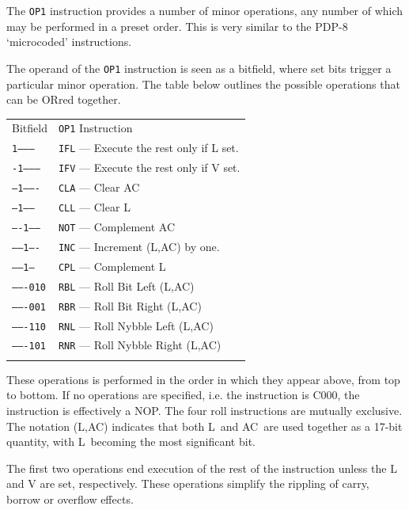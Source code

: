 \documentclass[11pt,a4paper,twocolumns]{article}
\newcommand\zebra{\rowcolors{2}{gray!20}{white}}
\newcommand\hex[1]{\textsf{#1}}
\newcommand\register[1]{\textsf{#1}}
\newcommand\A{\register{AC}}
\newcommand\Lreg{\register{L}}
\newcommand\Vreg{\register{V}}
\begin{document}
The {\tt OP1} instruction provides a number of minor operations, any
number of which may be performed in a preset order. This is very
similar to the PDP-8 ‘microcoded’ instructions.

The operand of the {\tt OP1} instruction is seen as a bitfield, where
set bits trigger a particular minor operation. The table below
outlines the possible operations that can be ORred together.

\vspace{1em}\noindent\begin{center}
\zebra
\begin{tabular}{ll}
  Bitfield & {\tt OP1} Instruction \\\noalign{\smallskip}\hline\noalign{\smallskip}
  {\tt 1---------} & {\tt IFL} — Execute the rest only if \Lreg{} set.\\
  {\tt -1--------} & {\tt IFV} — Execute the rest only if \Vreg{} set.\\
  {\tt --1-------} & {\tt CLA} — Clear \A \\
  {\tt ---1------} & {\tt CLL} — Clear \Lreg \\
  {\tt ----1-----} & {\tt NOT} — Complement \A \\
  {\tt -----1----} & {\tt INC} — Increment (\Lreg,\A) by one. \\
  {\tt ------1---} & {\tt CPL} — Complement \Lreg \\
  {\tt -------010} & {\tt RBL} — Roll Bit Left (\Lreg,\A) \\
  {\tt -------001} & {\tt RBR} — Roll Bit Right (\Lreg,\A) \\
  {\tt -------110} & {\tt RNL} — Roll Nybble Left (\Lreg,\A) \\
  {\tt -------101} & {\tt RNR} — Roll Nybble Right (\Lreg,\A) \\\noalign{\smallskip}\hline\noalign{\smallskip}
\end{tabular}
\end{center}\vspace{1em}

These operations is performed in the order in which they appear above,
from top to bottom. If no operations are specified, i.e. the
instruction is \hex{C000}, the instruction is effectively a NOP. The
four roll instructions are mutually exclusive. The notation (\Lreg,\A)
indicates that both \Lreg\ and \A\ are used together as a 17-bit
quantity, with \Lreg\ becoming the most significant bit.

The first two operations end execution of the rest of the instruction
unless the \Lreg{} and \Vreg{} are set, respectively. These operations
simplify the rippling of carry, borrow or overflow effects.
\end{document}
